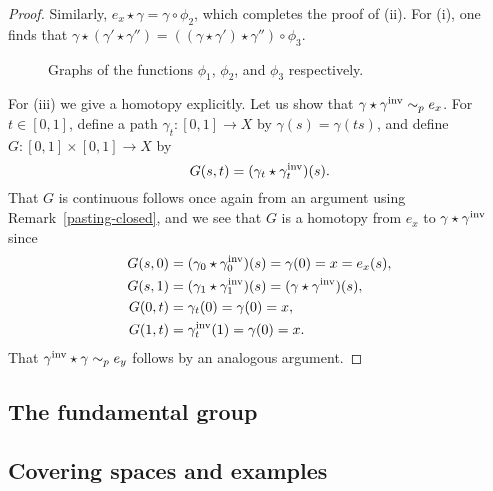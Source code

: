\begin{proof}
  Similarly, $e_x \star \gamma = \gamma \circ \phi_2$, which completes the proof of (ii). For (i), one finds that $\gamma \star (\gamma' \star \gamma'') = ((\gamma \star \gamma' ) \star \gamma'') \circ \phi_3$.
  \begin{figure}
    \centering
    \quad
    \quad
    \caption{Graphs of the functions $\phi_1$, $\phi_2$, and $\phi_3$ respectively.}
    \label{graph-reparametrisation}
  \end{figure}
  
  For (iii) we give a homotopy explicitly. Let us show that $\gamma \star \gamma^{\mathrm{inv}} \sim_p e_x$. For $t \in [0,1]$, define a path $\gamma_t : [0,1] \to X$ by $\gamma(s) = \gamma(ts)$, and define $G : [0,1] \times [0,1] \to X$ by
  \[
    G(s,t) = (\gamma_t \star \gamma_t^{\mathrm{inv}})(s).
  \]
  That $G$ is continuous follows once again from an argument using Remark~\ref{pasting-closed}, and we see that $G$ is a homotopy from $e_x$ to $\gamma \star \gamma^{\mathrm{inv}}$ since
  \begin{align*}
    G(s,0) &= (\gamma_0 \star \gamma_0^{\mathrm{inv}})(s) = \gamma(0) = x = e_x(s),\\
    G(s,1) &= (\gamma_1 \star \gamma_1^{\mathrm{inv}})(s) = (\gamma \star \gamma^{\mathrm{inv}})(s),\\
    G(0,t) &= \gamma_t(0) = \gamma(0) = x,\\
    G(1,t) &= \gamma_t^{\mathrm{inv}}(1) = \gamma(0) = x.
  \end{align*}
  That $\gamma^{\mathrm{inv}} \star \gamma \sim_p e_y$ follows by an analogous argument.
\end{proof}


\subsection{The fundamental group}

\subsection{Covering spaces and examples}
